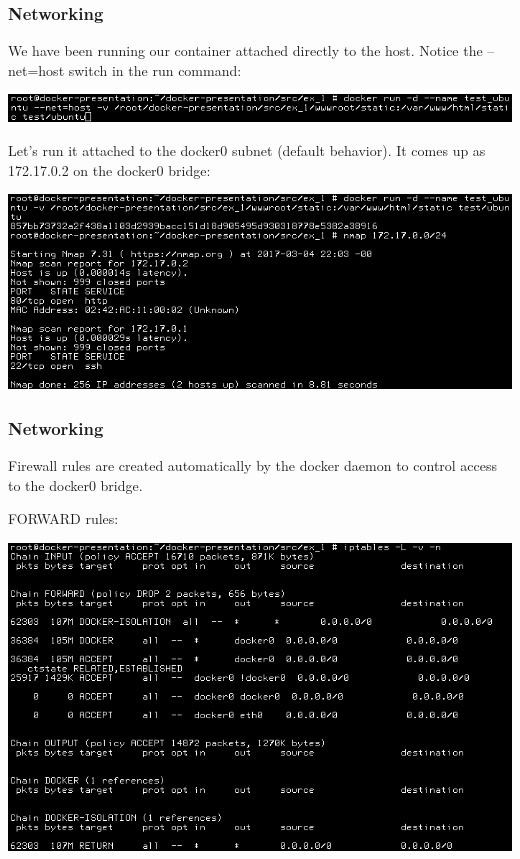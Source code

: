 \documentclass[helvetica,english,utf8,notitle,nologo]{beamer}
\begin{document}
\begin{frame}
  \frametitle{Networking}

  We have been running our container attached directly to the
  host. Notice the --net=host switch in the run command:

  \includegraphics[scale=0.44]{image_18}

  Let's run it attached to the docker0 subnet (default behavior). It
  comes up as 172.17.0.2 on the docker0 bridge:

  \includegraphics[scale=0.44]{image_25}
\end{frame}

\begin{frame}
  \frametitle{Networking}

  Firewall rules are created automatically by the docker daemon to
  control access to the docker0 bridge.

  FORWARD rules:

  \includegraphics[scale=0.44]{image_26}
\end{frame}
\end{document}
